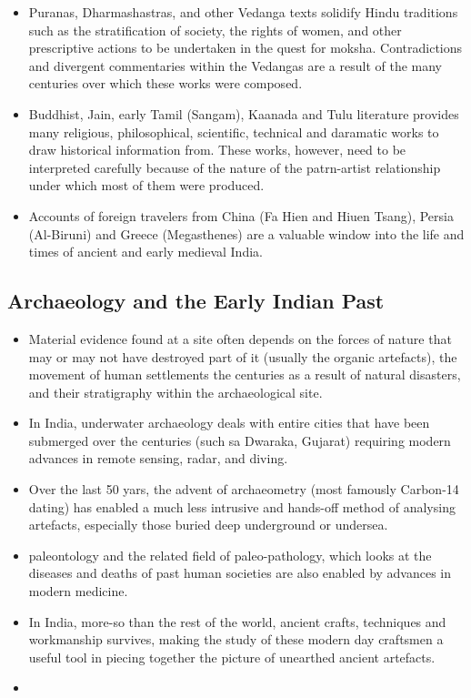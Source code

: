 \begin{itemize}
    \item Puranas, Dharmashastras, and other Vedanga texts solidify Hindu traditions such as the stratification of society, the rights of women, and other prescriptive actions to be undertaken in the quest for \Gls{moksha}. Contradictions and divergent commentaries within the Vedangas are a result of the many centuries over which these works were composed.
    \item Buddhist, Jain, early Tamil (Sangam), Kaanada and Tulu literature provides many religious, philosophical, scientific, technical and daramatic works to draw historical information from. These works, however, need to be interpreted carefully because of the nature of the patrn-artist relationship under which most of them were produced.
    \item Accounts of foreign travelers from China (Fa Hien and Hiuen Tsang), Persia (Al-Biruni) and Greece (Megasthenes) are a valuable window into the life and times of ancient and early medieval India.
\end{itemize}

\subsection{Archaeology and the Early Indian Past}
\begin{itemize}
    \item Material evidence found at a site often depends on the forces of nature that may or may not have destroyed part of it (usually the organic artefacts), the movement of human settlements the centuries as a result of natural disasters, and their \gls{stratigraphy} within the archaeological site.
    \item In India, underwater archaeology deals with entire cities that have been submerged over the centuries (such sa Dwaraka, Gujarat) requiring modern advances in remote sensing, radar, and diving.
    \item Over the last 50 yars, the advent of \gls{archaeometry} (most famously Carbon-14 dating) has enabled a much less intrusive and hands-off method of analysing artefacts, especially those buried deep underground or undersea.
    \item \Gls{paleontology} and the related field of paleo-pathology, which looks at the diseases and deaths of past human societies are also enabled by advances in modern medicine.
    \item In India, more-so than the rest of the world, ancient crafts, techniques and workmanship survives, making the study of these modern day craftsmen a useful tool in piecing together the picture of unearthed ancient artefacts.
    \item 
\end{itemize}
